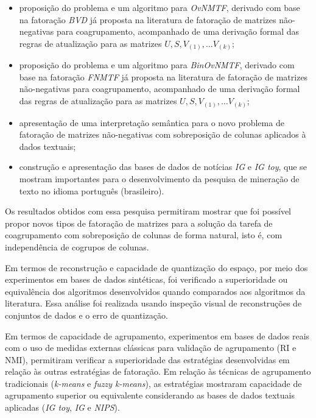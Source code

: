 \documentclass[
    12pt,                %
    oneside,            %
    a4paper,            %
    english,            %
    brazil                %
    ]{abntex2ppgsi}
\begin{document}
\begin{itemize}
    \item proposição do problema e um algoritmo para \textit{OvNMTF}, derivado com base na fatoração \textit{BVD} já proposta na literatura de fatoração de matrizes não-negativas para coagrupamento, acompanhado de uma derivação formal das regras de atualização para as matrizes $U, S, V_{(1)}, \dots V_{(k)}$;
    \item proposição do problema e um algoritmo para \textit{BinOvNMTF}, derivado com base na fatoração \textit{FNMTF} já proposta na literatura de fatoração de matrizes não-negativas para coagrupamento, acompanhado de uma derivação formal das regras de atualização para as matrizes $U, S, V_{(1)}, \dots V_{(k)}$;
    \item apresentação de uma interpretação semântica para o novo problema de fatoração de matrizes não-negativas com sobreposição de colunas aplicados à dados textuais;
    \item construção e apresentação das bases de dados de notícias \textit{IG} e \textit{IG toy}, que se mostram importantes para o desenvolvimento da pesquisa de mineração de texto no idioma português (brasileiro).
\end{itemize}

Os resultados obtidos com essa pesquisa permitiram mostrar que foi possível propor novos tipos de fatoração de matrizes para a solução da tarefa de coagrupamento com sobreposição de colunas de forma natural, isto é, com independência de cogrupos de colunas.

Em termos de reconstrução e capacidade de quantização do espaço, por meio dos experimentos em bases de dados sintéticas, foi verificado a superioridade ou equivalência dos algoritmos desenvolvidos quando comparados aos algoritmos da literatura.
Essa análise foi realizada usando inspeção visual de reconstruções de conjuntos de dados e o erro de quantização.

Em termos de capacidade de agrupamento, experimentos em bases de dados reais com o uso de medidas externas clássicas para validação de agrupamento (RI e NMI), permitiram verificar a superioridade das estratégias desenvolvidas em relação às outras estratégias de fatoração.
Em relação às técnicas de agrupamento tradicionais (\textit{k-means} e \textit{fuzzy k-means}), as estratégias mostraram capacidade de agrupamento superior ou equivalente considerando as bases de dados textuais aplicadas (\textit{IG toy}, \textit{IG} e \textit{NIPS}).
\end{document}
